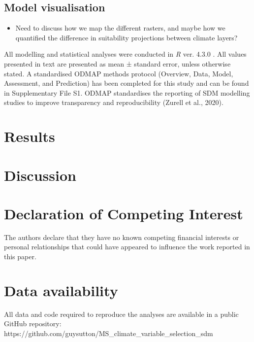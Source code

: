 \documentclass[
  authoryear,
  preprint,
  3p,
  onecolumn]{elsarticle}
\providecommand{\tightlist}{%
  \setlength{\itemsep}{0pt}\setlength{\parskip}{0pt}}\usepackage{longtable,booktabs,array}
\begin{document}
\hypertarget{model-visualisation}{%
\subsection{Model visualisation}\label{model-visualisation}}

\begin{itemize}
\tightlist
\item
  Need to discuss how we map the different rasters, and maybe how we
  quantified the difference in suitability projections between climate
  layers?
\end{itemize}

All modelling and statistical analyses were conducted in \emph{R} ver.
4.3.0 \citep{Team2023}. All values presented in text are presented as
mean ± standard error, unless otherwise stated. A standardised ODMAP
methods protocol (Overview, Data, Model, Assessment, and Prediction) has
been completed for this study and can be found in Supplementary File S1.
ODMAP standardises the reporting of SDM modelling studies to improve
transparency and reproducibility (Zurell et al., 2020).

\hypertarget{results}{%
\section{Results}\label{results}}

\hypertarget{discussion}{%
\section{Discussion}\label{discussion}}

\hypertarget{declaration-of-competing-interest}{%
\section{Declaration of Competing
Interest}\label{declaration-of-competing-interest}}

The authors declare that they have no known competing financial
interests or personal relationships that could have appeared to
influence the work reported in this paper.

\hypertarget{data-availability}{%
\section{Data availability}\label{data-availability}}

All data and code required to reproduce the analyses are available in a
public GitHub repository:
https://github.com/guysutton/MS\_climate\_variable\_selection\_sdm
\end{document}
